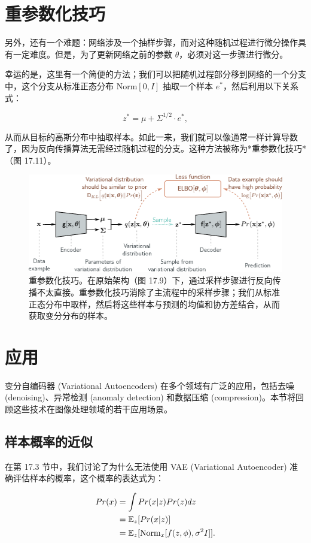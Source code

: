 \documentclass[lang=cn,newtx,10pt,scheme=chinese]{elegantbook}
\begin{document}
\section{重参数化技巧}
另外，还有一个难题：网络涉及一个抽样步骤，而对这种随机过程进行微分操作具有一定难度。但是，为了更新网络之前的参数 \(\theta\)，必须对这一步骤进行微分。

幸运的是，这里有一个简便的方法；我们可以把随机过程部分移到网络的一个分支中，这个分支从标准正态分布 \(\text{Norm}[0, I]\) 抽取一个样本 \(e^*\)，然后利用以下关系式：

\begin{equation}
z^* = \mu + \Sigma^{1/2} \cdot e^*, 
\end{equation}

从而从目标的高斯分布中抽取样本。如此一来，我们就可以像通常一样计算导数了，因为反向传播算法无需经过随机过程的分支。这种方法被称为*重参数化技巧*（图 17.11）。

\begin{figure}[ht!]
\centering
\includegraphics[width=0.7\linewidth]{PDFFigures/UDLChap17PDF/VAEArch.pdf}
\caption{重参数化技巧。在原始架构（图 17.9）下，通过采样步骤进行反向传播不太直接。重参数化技巧消除了主流程中的采样步骤；我们从标准正态分布中取样，然后将这些样本与预测的均值和协方差结合，从而获取变分分布的样本。}
\end{figure}


\section{应用}
变分自编码器 (Variational Autoencoders) 在多个领域有广泛的应用，包括去噪 (denoising)、异常检测 (anomaly detection) 和数据压缩 (compression)。本节将回顾这些技术在图像处理领域的若干应用场景。

\subsection{样本概率的近似}
在第 17.3 节中，我们讨论了为什么无法使用 VAE (Variational Autoencoder) 准确评估样本的概率，这个概率的表达式为：


\begin{align}
Pr(x) &= \int Pr(x|z)Pr(z)dz \notag \\
&= \mathbb{E}_{z} [Pr(x|z)] \notag \\
&= \mathbb{E}_{z} [\text{Norm}_x[f(z, \phi), \sigma^2 I]]. 
\end{align}
\end{document}
